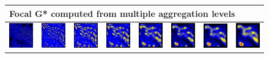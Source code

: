\documentclass{itatnew}
\begin{document}
\begin{figure}[htp]
\begin{tabular}{cccccccc}
  \end{tabular}
  \begin{tabular}{cccccccc}
    \multicolumn{8}{l}{Focal G* computed from multiple aggregation levels} \\
    \hline
    \vspace*{2mm}
    \includegraphics[width=4.6em]{images/gen-raw-zoom-focalgstar-1}&
    \includegraphics[width=4.6em]{images/gen-raw-zoom-focalgstar-2}&
    \includegraphics[width=4.6em]{images/gen-raw-zoom-focalgstar-3}&
    \includegraphics[width=4.6em]{images/gen-raw-zoom-focalgstar-4}&
    \includegraphics[width=4.6em]{images/gen-raw-zoom-focalgstar-5}&
    \includegraphics[width=4.6em]{images/gen-raw-zoom-focalgstar-6}&
    \includegraphics[width=4.6em]{images/gen-raw-zoom-focalgstar-7}&
    \includegraphics[width=4.6em]{images/gen-raw-zoom-focalgstar-8}
  \end{tabular}
  

\end{figure}
\end{document}
